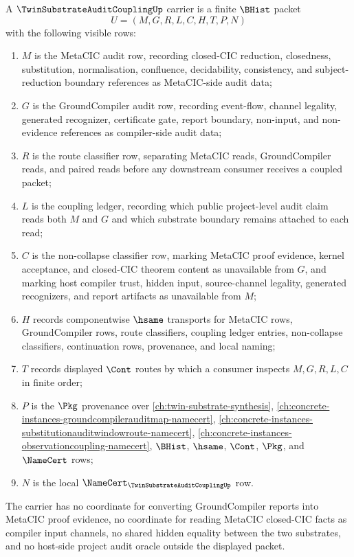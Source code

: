 \begin{definition}
\label{def:twin-substrate-audit-coupling-carrier}
A $\TwinSubstrateAuditCouplingUp$ carrier is a finite $\BHist$ packet
$$
U=(M,G,R,L,C,H,T,P,N)
$$
with the following visible rows:
\begin{enumerate}
\item $M$ is the MetaCIC audit row, recording closed-CIC reduction, closedness, substitution, normalisation, confluence, decidability, consistency, and subject-reduction boundary references as MetaCIC-side audit data;
\item $G$ is the GroundCompiler audit row, recording event-flow, channel legality, generated recognizer, certificate gate, report boundary, non-input, and non-evidence references as compiler-side audit data;
\item $R$ is the route classifier row, separating MetaCIC reads, GroundCompiler reads, and paired reads before any downstream consumer receives a coupled packet;
\item $L$ is the coupling ledger, recording which public project-level audit claim reads both $M$ and $G$ and which substrate boundary remains attached to each read;
\item $C$ is the non-collapse classifier row, marking MetaCIC proof evidence, kernel acceptance, and closed-CIC theorem content as unavailable from $G$, and marking host compiler trust, hidden input, source-channel legality, generated recognizers, and report artifacts as unavailable from $M$;
\item $H$ records componentwise $\hsame$ transports for MetaCIC rows, GroundCompiler rows, route classifiers, coupling ledger entries, non-collapse classifiers, continuation rows, provenance, and local naming;
\item $T$ records displayed $\Cont$ routes by which a consumer inspects $M,G,R,L,C$ in finite order;
\item $P$ is the $\Pkg$ provenance over \autoref{ch:twin-substrate-synthesis}, \autoref{ch:concrete-instances-groundcompilerauditmap-namecert}, \autoref{ch:concrete-instances-substitutionauditwindowroute-namecert}, \autoref{ch:concrete-instances-observationcoupling-namecert}, $\BHist$, $\hsame$, $\Cont$, $\Pkg$, and $\NameCert$ rows;
\item $N$ is the local $\NameCert_{\TwinSubstrateAuditCouplingUp}$ row.
\end{enumerate}
The carrier has no coordinate for converting GroundCompiler reports into MetaCIC proof evidence, no coordinate for reading MetaCIC closed-CIC facts as compiler input channels, no shared hidden equality between the two substrates, and no host-side project audit oracle outside the displayed packet.
\end{definition}

